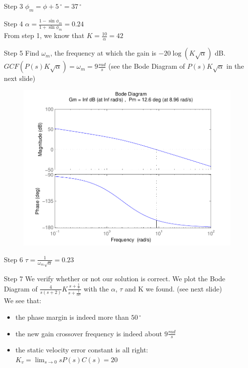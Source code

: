 \begin{frame}
\begin{exampleblock}{Step 3}
	$\phi_m = \phi + 5\,^{\circ} = 37\,^{\circ}$
\end{exampleblock}
	\begin{exampleblock}{Step 4}
		$\alpha = \frac{1 - \sin \phi_m}{1 + \sin \phi_m} = 0.24$ \\
		From step 1, we know that $K = \frac{10}{\alpha} = 42$
	\end{exampleblock}
	\begin{exampleblock}{Step 5}
		Find $\omega_m$, the frequency at which the gain is $-20\log\left( K\sqrt{\alpha}\right) $ dB. 
		$GCF\left( P(s)K\sqrt{\alpha}\right) = \omega_m = 9 \frac{rad}{s}$ (see the Bode Diagram of  $P(s)K\sqrt{\alpha}$ in the next slide)
	\end{exampleblock}
\end{frame}

\begin{frame}
	\begin{figure}
		\centering
		\includegraphics[width=0.7
		\linewidth]{exampleleadsteptangent}
	\end{figure}
\end{frame}

\begin{frame}
	\begin{exampleblock}{Step 6}
		$\tau = \frac{1}{\omega_m\sqrt{\alpha}} = 0.23$
	\end{exampleblock}
	\begin{exampleblock}{Step 7}
	We verify whether or not our solution is correct. We plot the Bode Diagram of $ \frac{4}{s(s+2)} K \frac{s+\frac{1}{\tau}}{s+\frac{1}{\alpha\tau}}$ with the $\alpha$, $\tau$ and K we found. (see next slide) \\
	We see that: 
	\begin{itemize}
		\item the phase margin is indeed more than $50\,^{\circ}$ 
		\item the new gain crossover frequency is indeed about $9\frac{rad}{s}$
		\item the static velocity error constant is all right: $K_v = \lim_{s \to 0} sP(s)C(s) = 20$
	\end{itemize} 
	\end{exampleblock}
\end{frame}

